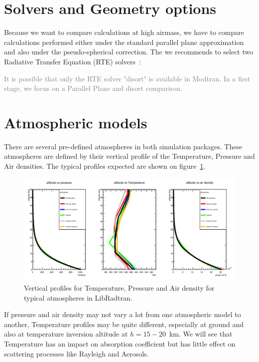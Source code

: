 \documentclass[a4paper]{article}
\begin{document}
\section{Solvers and Geometry options}

Because we want to compare calculations at high airmass, we have to compare calculations performed either under the standard parallel plane approximation and also under the pseudo-spherical correction.
The we recommends to select two Radiative Transfer Equation (RTE) solvers~:

\textcolor{gray}{It is possible that only the RTE solver "disort" is available in Modtran. In a first stage, we focus on a Parallel Plane and disort comparison.}


\section{Atmospheric models}

There are several pre-defined atmospheres in both simulation packages. These atmospheres are defined by their
vertical profile of the Temperature, Pressure and Air densities. The typical profiles expected are shown on figure~\ref{fig:rt_atmprof}.

\begin{figure}
\centering
\includegraphics[width=1\textwidth]{images/rt_atmprof.png}
\caption{\label{fig:rt_atmprof}Vertical profiles for Temperature, Pressure and Air density for typical atmospheres in LibRadtran.}
\end{figure}
If pressure and air density may not vary a lot from one atmospheric model to another, Temperature profiles may be quite different, especially at ground and also at temperature inversion altitude at $h=15-20$~km.
We will see that Temperature has an impact on absorption coefficient but has little effect on scattering processes like Rayleigh and Aerosols.
\end{document}
